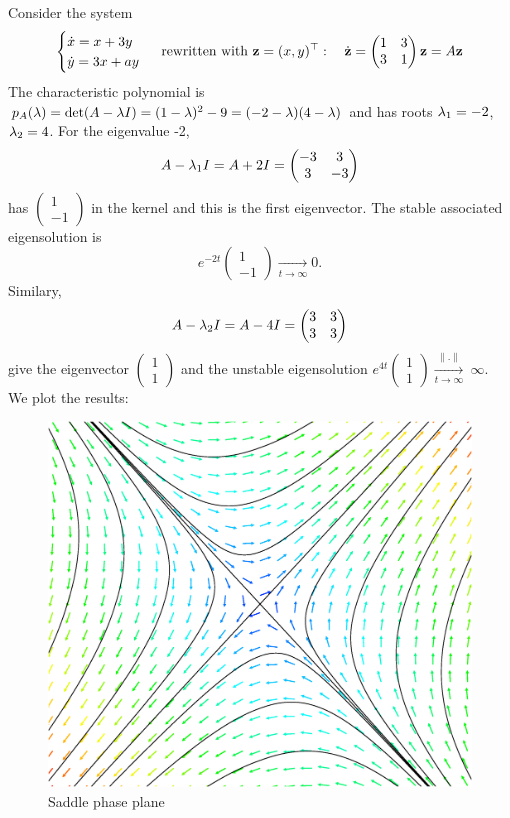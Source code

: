 \begin{exemple}[saddle]
Consider the system
$$\begin{cases}
    \dot{x}=x+3y \\
    \dot{y}=3x+ay
\end{cases}
\text{ rewritten with } \mathbf{z}=(x,y)^\top: \quad \dot{\mathbf{z}}=
\begin{pmatrix} 1&3\\3&1 \end{pmatrix}\mathbf{z} =A\mathbf{z}
$$
The characteristic polynomial is $p_A(\lambda)=\det(A-\lambda I)=(1-\lambda)^2-9=(-2-\lambda)(4-\lambda)$ and has roots $\lambda_1=-2$, $\lambda_2=4$. For the eigenvalue -2, $$ A-\lambda_1I = A+2I= \begin{pmatrix} -3&3\\3&-3 \end{pmatrix} $$
has $\begin{pmatrix}1\\-1\end{pmatrix}$ in the kernel and this is the first eigenvector. The stable associated eigensolution is $$e^{-2t}\begin{pmatrix}1\\-1\end{pmatrix} \xrightarrow[t\to\infty]{} 0.$$
Similary, 
$$ A-\lambda_2I = A-4I= \begin{pmatrix} 3&3\\3&3 \end{pmatrix} $$
give the eigenvector $\begin{pmatrix}1\\1\end{pmatrix}$ and the unstable eigensolution $e^{4t}\begin{pmatrix}1\\1\end{pmatrix}\xrightarrow[t\to\infty]{\|.\|}~\infty$. We plot the results: 
\begin{figure}[H]
    \centering
    \includegraphics[scale=0.3]{images/saddle.eps}
    \caption{Saddle phase plane}
    \label{fig:question11.1}
\end{figure}


\end{exemple}
